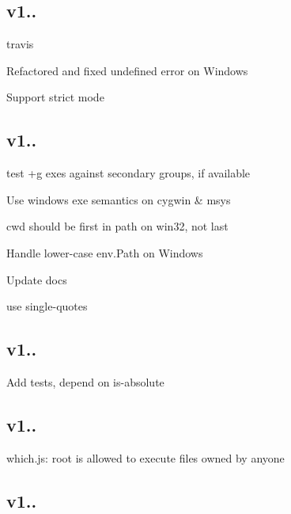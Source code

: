 \subsection*{v1..}


\begin{DoxyItemize}
\item travis
\item Refactored and fixed undefined error on Windows
\item Support strict mode
\end{DoxyItemize}

\subsection*{v1..}


\begin{DoxyItemize}
\item test +g exes against secondary groups, if available
\item Use windows exe semantics on cygwin \& msys
\item cwd should be first in path on win32, not last
\item Handle lower-\/case \textquotesingle{}env.\+Path\textquotesingle{} on Windows
\item Update docs
\item use single-\/quotes
\end{DoxyItemize}

\subsection*{v1..}


\begin{DoxyItemize}
\item Add tests, depend on is-\/absolute
\end{DoxyItemize}

\subsection*{v1..}


\begin{DoxyItemize}
\item which.\+js\+: root is allowed to execute files owned by anyone
\end{DoxyItemize}

\subsection*{v1..}


